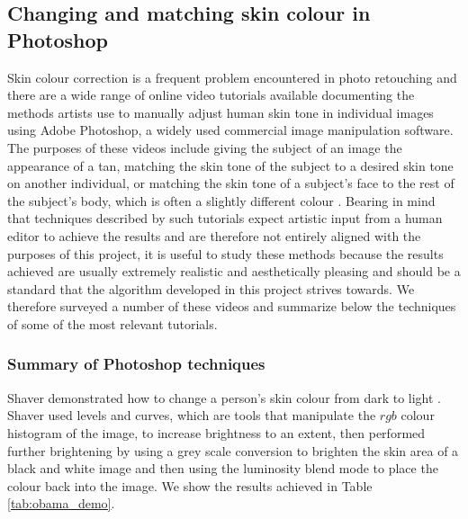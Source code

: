 \subsection{Changing and matching skin colour in Photoshop}

Skin colour correction is a frequent problem encountered in photo retouching and there are a wide range of online video tutorials available documenting the methods artists use to manually adjust human skin tone in individual images using Adobe Photoshop, a widely used commercial image manipulation software. The purposes of these videos include giving the subject of an image the appearance of a tan, matching the skin tone of the subject to a desired skin tone on another individual, or matching the skin tone of a subject's face to the rest of the subject's body, which is often a slightly different colour \cite{photoshop:tan, photoshop:match_other, photoshop:match_body}. Bearing in mind that techniques described by such tutorials expect artistic input from a human editor to achieve the results and are therefore not entirely aligned with the purposes of this project, it is useful to study these methods because the results achieved are usually extremely realistic and aesthetically pleasing and should be a standard that the algorithm developed in this project strives towards. We therefore surveyed a number of these videos and summarize below the techniques of some of the most relevant tutorials.

\subsubsection*{Summary of Photoshop techniques}

Shaver demonstrated how to change a person's skin colour from dark to light \cite{photoshop:obama}. Shaver used levels and curves, which are tools that manipulate the $rgb$ colour histogram of the image, to increase brightness to an extent, then performed further brightening by using a grey scale conversion to brighten the skin area of a black and white image and then using the luminosity blend mode to place the colour back into the image. We show the results achieved in Table \ref{tab:obama_demo}.

